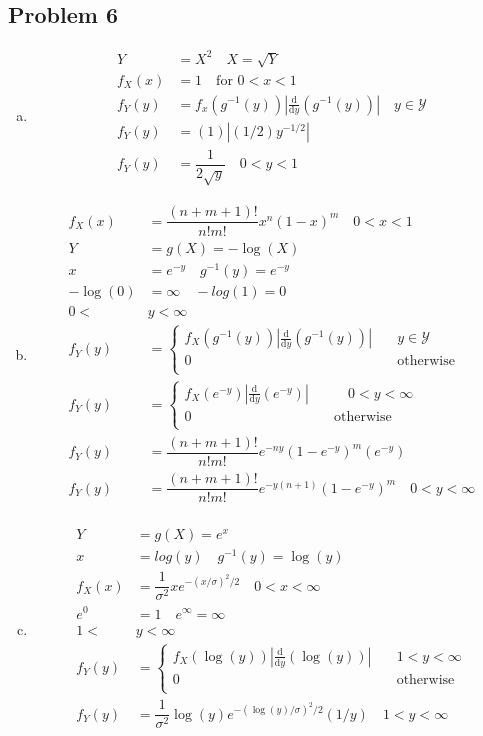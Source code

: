 \documentclass{article}
\newcommand{\yderiv}[1]{\frac{\mathrm{d}}{\mathrm{d}y} (#1)}
\begin{document}
\begin{flushleft}
\section*{Problem 6}
\begin{enumerate}[(a)]
\item
\begin{align*}
Y&=X^2 \quad X=\sqrt{Y}\\
f_X(x)&=1 \quad \text{for } 0<x<1\\
f_Y(y)&=f_x(g^{-1}(y))\left|\yderiv{g^{-1}(y)} \right| \quad y \in \mathcal{Y}\\
f_Y(y)&=(1)|(1/2)y^{-1/2}|\\
f_Y(y)&=\dfrac{1}{2\sqrt{y}} \quad 0<y<1
\end{align*}
\item
\begin{align*}
f_X(x)&=\dfrac{(n+m+1)!}{n!m!}x^n(1-x)^m \quad 0<x<1\\
Y&=g(X)=-\log(X)\\
x&=e^{-y} \quad g^{-1}(y)=e^{-y}\\
-\log(0)&=\infty \quad -log(1)=0\\
0<&y<\infty\\
f_Y(y)&=\begin{cases}
f_X(g^{-1}(y))\left|\yderiv{g^{-1}(y)}\right|& \quad y \in \mathcal{Y}\\
0& \quad \text{otherwise}\\
\end{cases}\\
f_Y(y)&=\begin{cases}
f_X(e^{-y})\left|\yderiv{e^{-y}}\right|& \quad \quad 0<y<\infty\\
0& \quad \text{otherwise}\\
\end{cases}\\
f_Y(y)&=\dfrac{(n+m+1)!}{n!m!}e^{-ny}(1-e^{-y})^{m}(e^{-y})\\
f_Y(y)&=\dfrac{(n+m+1)!}{n!m!}e^{-y(n+1)}(1-e^{-y})^{m} \quad 0<y<\infty\\
\end{align*}
\item 
\begin{align*}
Y&=g(X)=e^x\\
x&=log(y) \quad g^{-1}(y)=\log(y)\\
f_X(x)&=\dfrac{1}{\sigma^2}xe^{-(x/\sigma)^2/2} \quad 0<x<\infty\\
e^0&=1 \quad e^{\infty}=\infty\\
1<&y<\infty\\
f_Y(y)&=\begin{cases}
f_X(\log(y))\left|\yderiv{\log(y)}\right|& \quad 1<y<\infty\\
0& \quad \text{otherwise}\\
\end{cases}\\
f_Y(y)&=\dfrac{1}{\sigma^2}\log(y)e^{-(\log(y)/\sigma)^2/2}(1/y) \quad 1<y<\infty\\
\end{align*}
\end{enumerate}


\end{flushleft}
\end{document}
